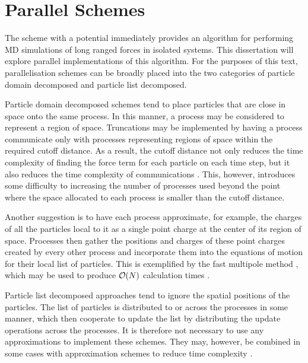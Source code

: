 \section{Parallel Schemes}
\label{sec:background:subsec:parallel_schemes}

%
The \velocityverlet{} scheme with a \twobody{} potential
immediately provides an algorithm for
performing MD simulations of long ranged forces in isolated systems.
%
This dissertation will explore parallel implementations of this algorithm.
%
For the purposes of this text,
parallelisation schemes can be broadly placed into the two categories
of particle domain decomposed and particle list decomposed.

Particle domain decomposed schemes tend to place particles that are
close in space onto the same process.
%
In this manner, a process may be considered to represent a region of space.
%
Truncations may be implemented by having a process communicate
only with processes representing regions of space within the required
cutoff distance.
%
As a result, the cutoff distance not only reduces the time complexity
of finding the force term for each particle on each time step,
but it also reduces the time complexity of communications
\cite{plimpton1995fast}.
%
This, however, introduces some difficulty to increasing the number
of processes used beyond the point where the space allocated to
each process is smaller than the cutoff distance.

Another suggestion is to have each process approximate, for example,
the charges of all the particles local to it as a single point charge
at the center of its region of space.
%
Processes then gather the positions and charges of these point charges
created by every other process and incorporate them into the equations
of motion for their local list of particles.
%
This is exemplified by the fast multipole method
\cite{appel1985efficient},
which may be used to produce $\mathcal{O}{\left({ N }\right)}$
calculation times \cite{esselink1992order}.


Particle list decomposed approaches tend to ignore the spatial positions
of the particles.
%
The list of particles is distributed to or across the processes in some manner,
which then cooperate to update the list by distributing the update
operations across the processes.
%
It is therefore not necessary to use any approximations to
implement these schemes.
%
They may, however, be combined in some cases with
approximation schemes to reduce time complexity
\cite{smith1994parallel}.

